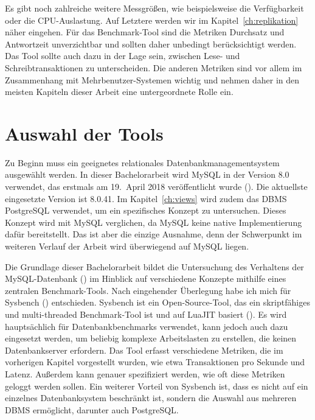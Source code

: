 Es gibt noch zahlreiche weitere Messgrößen, wie beispielsweise die Verfügbarkeit oder die CPU-Auslastung.
Auf Letztere werden wir im Kapitel~\ref{ch:replikation} näher eingehen.
Für das Benchmark-Tool sind die Metriken Durchsatz und Antwortzeit unverzichtbar und sollten daher unbedingt berücksichtigt werden.
Das Tool sollte auch dazu in der Lage sein, zwischen Lese- und Schreibtransaktionen zu unterscheiden.
Die anderen Metriken sind vor allem im Zusammenhang mit Mehrbenutzer-Systemen wichtig und nehmen daher in den meisten Kapiteln dieser Arbeit eine untergeordnete Rolle ein.

\section{Auswahl der Tools}\label{sec:auswahl-der-tools}

Zu Beginn muss ein geeignetes relationales Datenbankmanagementsystem ausgewählt werden.
In dieser Bachelorarbeit wird MySQL in der Version 8.0 verwendet, das erstmals am 19.\ April 2018 veröffentlicht wurde (\cite{mysql_release}).
Die aktuellste eingesetzte Version ist 8.0.41.
Im Kapitel~\ref{ch:views} wird zudem das DBMS PostgreSQL verwendet, um ein spezifisches Konzept zu untersuchen.
Dieses Konzept wird mit MySQL verglichen, da MySQL keine native Implementierung dafür bereitstellt.
Das ist aber die einzige Ausnahme, denn der Schwerpunkt im weiteren Verlauf der Arbeit wird überwiegend auf MySQL liegen.

Die Grundlage dieser Bachelorarbeit bildet die Untersuchung des Verhaltens der MySQL-Datenbank (\cite{sysbench_mysql}) im Hinblick auf verschiedene Konzepte mithilfe eines zentralen Benchmark-Tools.
Nach eingehender Überlegung habe ich mich für Sysbench (\cite{sysbench_repo}) entschieden.
Sysbench ist ein Open-Source-Tool, das ein skriptfähiges und multi-threaded Benchmark-Tool ist und auf LuaJIT basiert (\cite[pp. 50--66]{schwartz2012high}).
Es wird hauptsächlich für Datenbankbenchmarks verwendet, kann jedoch auch dazu eingesetzt werden, um beliebig komplexe Arbeitslasten zu erstellen, die keinen Datenbankserver erfordern.
Das Tool erfasst verschiedene Metriken, die im vorherigen Kapitel vorgestellt wurden, wie etwa Transaktionen pro Sekunde und Latenz.
Außerdem kann genauer spezifiziert werden, wie oft diese Metriken geloggt werden sollen.
Ein weiterer Vorteil von Sysbench ist, dass es nicht auf ein einzelnes Datenbanksystem beschränkt ist, sondern die Auswahl aus mehreren DBMS ermöglicht, darunter auch PostgreSQL\@.

